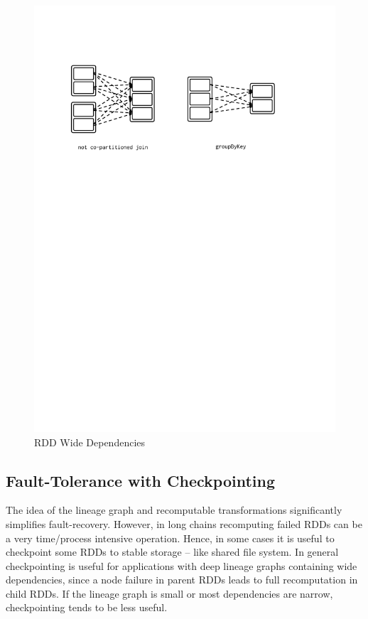 \begin{itemize}
\begin{figure}[p]
        \includegraphics[clip,trim=2cm 19.5cm 3.5cm 4cm]{wide-dep.pdf}
        \caption{RDD Wide Dependencies}
        \label{fig:sp:wide-dep}
    \end{figure}
\end{itemize}

\subsection{Fault-Tolerance with Checkpointing}
\label{sp:fault}

The idea of the lineage graph and recomputable transformations significantly simplifies fault-recovery. However, in long chains recomputing failed RDDs can be a very time/process intensive operation. Hence, in some cases it is useful to checkpoint some RDDs to stable storage -- like shared file system. In general checkpointing is useful for applications with deep lineage graphs containing wide dependencies, since a node failure in parent RDDs leads to full recomputation in child RDDs. If the lineage graph is small or most dependencies are narrow, checkpointing tends to be less useful. 

